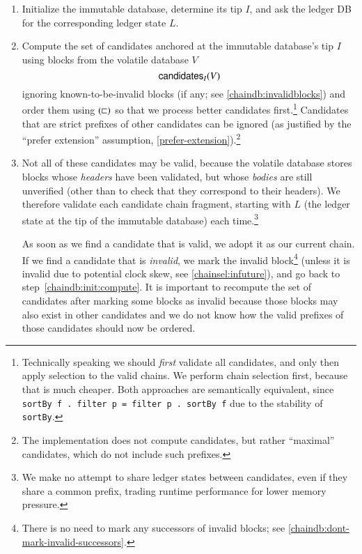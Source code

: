 \begin{enumerate}

\item
\label{chaindb:init:imm}
Initialize the immutable database, determine its tip $I$, and ask the
ledger DB for the corresponding ledger state $L$.

\item Compute the set of candidates anchored at the immutable database's tip
\label{chaindb:init:compute}
$I$ using blocks from the volatile database $V$
$$\mathsf{candidates}_I(V)$$
ignoring known-to-be-invalid blocks (if any; see \cref{chaindb:invalidblocks})
and order them using $(\mathrel{\sqsubset})$  so that we process better candidates
first.\footnote{Technically speaking we should \emph{first} validate all
candidates, and only then apply selection to the valid chains. We perform chain
selection first, because that is much cheaper. Both approaches are semantically
equivalent, since \lstinline!sortBy f . filter p = filter p . sortBy f! due to
the stability of \lstinline!sortBy!.} Candidates that are strict prefixes of
other candidates can be ignored (as justified by the ``prefer extension''
assumption, \cref{prefer-extension}).\footnote{The implementation does not
compute candidates, but rather ``maximal'' candidates, which do not include such
prefixes.}

\item
\label{chaindb:init:select}
Not all of these candidates may be valid, because the volatile database stores
blocks whose \emph{headers} have been validated, but whose \emph{bodies} are
still unverified (other than to check that they correspond to their headers).
We therefore validate each candidate chain fragment, starting with $L$ (the
ledger state at the tip of the immutable database) each time.\footnote{We make
no attempt to share ledger states between candidates, even if they share a
common prefix, trading runtime performance for lower memory pressure.}

As soon as we find a candidate that is valid, we adopt it as our current chain.
If we find a candidate that is \emph{invalid}, we mark the invalid
block\footnote{There is no need to mark any successors of invalid blocks; see
\cref{chaindb:dont-mark-invalid-successors}.} (unless it is invalid due to
potential clock skew, see \cref{chainsel:infuture}), and go back to
step~\ref{chaindb:init:compute}. It is important to recompute the set of
candidates after marking some blocks as invalid because those blocks may also
exist in other candidates and we do not know how the valid prefixes of those
candidates should now be ordered.

\end{enumerate}

